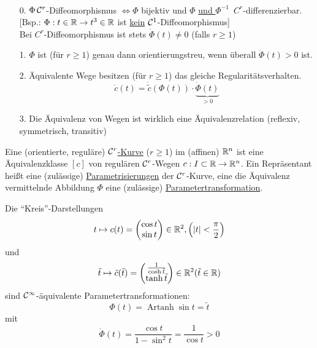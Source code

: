 \begin{bemerkung} \(\)
 \begin{enumerate}
  \item[0.] \(\Phi \, \mathcal{C}^r\)-Diffeomorphismus \(\Leftrightarrow \Phi\) bijektiv und \(\Phi\) \uline{und \(\Phi^{-1}\)}\, \(C^r\)-differenzierbar. 
  [Bsp.: \(\Phi: t \in \mathbb{R} \to t^3 \in \mathbb{R}\) ist \uline{kein} \(\mathcal{C}^1\)-Diffeomorphismus] \\
  Bei \(C^r\)-Diffeomorphismus ist stets \(\dot \Phi(t)\ne 0\) (falls \(r\ge 1\))
  \item[1.] \(\Phi\) ist (für \(r\ge 1\)) genau dann orientierungstreu, wenn überall \(\dot \Phi(t)>0\) ist.
  \item[2.] Äquivalente Wege besitzen (für \(r\ge 1\)) das gleiche Regularitätsverhalten.
  \[
   \dot c(t)= \dot{\tilde c} (\Phi(t)) \cdot \underbrace{\dot \Phi(t)}_{>0}
  \]
  \item[3.] Die Äquivalenz von Wegen ist wirklich eine Äquivalenzrelation (reflexiv, symmetrisch, transitiv)
 \end{enumerate}
\end{bemerkung}

\begin{definition}
 Eine (orientierte, reguläre) \uline{\(\mathcal{C}^r\)-Kurve} (\(r\ge1\)) im (affinen) \(\mathbb{R}^n\) ist eine Äquivalenzklasse \([c]\) von regulären \(\mathcal{C}^r\)-Wegen \(c : I \subset \mathbb{R} \to \mathbb{R}^n\). Ein Repräsentant heißt eine (zulässige) \uline{Parametrisierungen} der \(\mathcal{C}^r\)-Kurve, eine die Äquivalenz vermittelnde Abbildung \(\Phi\) eine (zulässige) \uline{Parametertransformation}.
\end{definition}

\begin{bsp}
 Die "`Kreis"'-Darstellungen 
 \[
 t \mapsto c(t)=\begin{pmatrix}
                 \cos t \\
                 \sin t
                \end{pmatrix} \in \mathbb{R}^2, \left(|t|<\frac\pi2\right)
 \]
 und 
     \[
      \tilde t\mapsto \tilde c(\tilde t) = \begin{pmatrix}
                                             \frac1{\cosh \tilde t} \\
                                             \tanh \tilde t
                                            \end{pmatrix} \in \mathbb{R}^2 (\tilde t \in \mathbb{R}) 
     \]
 sind \(\mathcal{C}^\infty\)-äquivalente Parametertransformationen: \[
                                                            \Phi(t) = \operatorname{Artanh} \sin t = \tilde t
                                                           \]
mit
\[
 \dot \Phi(t)=\frac{\cos t}{1-\sin^2 t}= \frac1{\cos t} >0
\]
\end{bsp}

